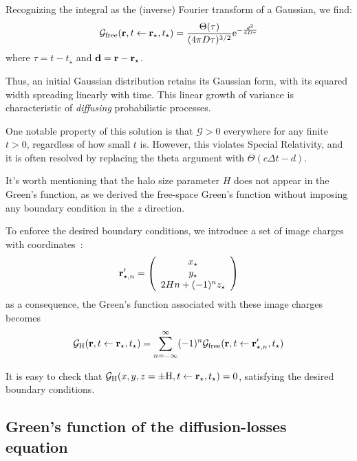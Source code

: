 Recognizing the integral as the (inverse) Fourier transform of a Gaussian, we find:
%
\begin{equation} 
\mathcal G_{\rm free} (\vb r, t \leftarrow \vb r_\star, t_\star) 
= \frac{\Theta(\tau)}{(4\pi D \tau)^{3/2}} 
{\rm e}^{-\frac{d^2}{4 D \tau}}
\end{equation}
%
where $\tau = t-t_\star$ and $\vb d = \vb r - \vb r_\star$.

Thus, an initial Gaussian distribution retains its Gaussian form, with its squared width spreading linearly with time. This linear growth of variance is characteristic of \emph{diffusing} probabilistic processes.

One notable property of this solution is that $\mathcal G > 0$ everywhere for any finite $t > 0$, regardless of how small $t$ is. However, this violates Special Relativity, and it is often resolved by replacing the theta argument with $\Theta(c \Delta t - d)$.

It's worth mentioning that the halo size parameter $H$ does not appear in the Green's function, as we derived the free-space Green's function without imposing any boundary condition in the $z$ direction.

To enforce the desired boundary conditions, we introduce a set of image charges with coordinates~\cite{Cowsik1979apj,Baltz1998prd,Mertsch2011jcap}:
%
\begin{equation}
\vb r_{\star,n}^\prime = 
\left(\begin{array}{c}
x_\star\\
y_\star\\
2 H n + (-1)^n z_\star 
\end{array}\right)
\end{equation}
%
as a consequence, the Green's function associated with these image charges becomes
%
\begin{equation}
\mathcal G_{\rm H} (\vb r, t \leftarrow \vb r_\star, t_\star) = \sum_{n=-\infty}^{\infty} (-1)^n \mathcal G_{\rm free} (\vb r, t \leftarrow \vb r_{\star,n}^\prime, t_\star)  
\end{equation}

It is easy to check that $\mathcal G_{\rm H}(x, y, {z = \pm {\textrm H}}, t\leftarrow \vb r_\star, t_\star) = 0$, satisfying the desired boundary conditions.

\subsection{Green's function of the diffusion-losses equation}

